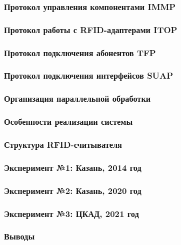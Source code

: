 \begin{frame}
    \frametitle{Протокол управления компонентами IMMP}
\end{frame}

\begin{frame}
    \frametitle{Протокол работы с RFID-адаптерами ITOP}
\end{frame}

\begin{frame}
    \frametitle{Протокол подключения абонентов TFP}
\end{frame}

\begin{frame}
    \frametitle{Протокол подключения интерфейсов SUAP}
\end{frame}

\begin{frame}
    \frametitle{Организация параллельной обработки}
\end{frame}

\begin{frame}
    \frametitle{Особенности реализации системы}
\end{frame}

\begin{frame}
    \frametitle{Структура RFID-считывателя}
\end{frame}

\begin{frame}
    \frametitle{Эксперимент №1: Казань, 2014 год}
\end{frame}

\begin{frame}
    \frametitle{Эксперимент №2: Казань, 2020 год}
\end{frame}

\begin{frame}
    \frametitle{Эксперимент №3: ЦКАД, 2021 год}
\end{frame}

\begin{frame}
    \frametitle{Выводы}
\end{frame}




